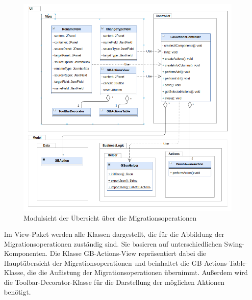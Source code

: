 	
	\begin{figure}[H]
		\centering
		\includegraphics[width=\textwidth]{images/sichten/modulsicht-gbactions}
		\caption{Modulsicht der Übersicht über die  Migrationsoperationen}
		\label{img:modulsicht-gbactions}
	\end{figure}
	Im View-Paket werden alle Klassen dargestellt, die für die Abbildung der Migrationsoperationen zuständig sind. Sie basieren auf unterschiedlichen Swing-Komponenten. Die Klasse GB-Actions-View repräsentiert dabei die Hauptübersicht der Migrationsoperationen und beinhaltet die GB-Actions-Table-Klasse, die die Auflistung der Migrationsoperationen übernimmt. Außerdem wird die Toolbar-Decorator-Klasse für die Darstellung der möglichen Aktionen benötigt.\\
